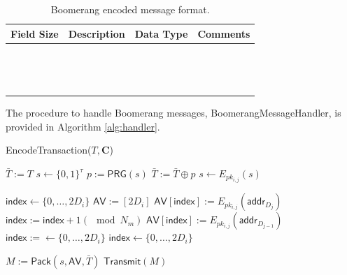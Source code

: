 \begin{table}
\begin{center}
\caption{Boomerang encoded message format.}
\label{tab:msg-header}
    \begin{tabular}{|c|c|c|l|} \hline
    \textbf{Field Size} & {\bf Description} & {\bf Data Type} & {\bf Comments} \\ \hline
    ~ & ~ & ~ & ~ \\
    ~ & ~ & ~ & ~ \\
    ~ & ~ & ~ & ~ \\ \hline
    \end{tabular}
\end{center}
\end{table}

The procedure to handle Boomerang messages, {\sf BoomerangMessageHandler}, is provided in Algorithm \ref{alg:handler}. 

\begin{algorithm}[t!]
\caption{{\sf EncodeTransaction}($T, \mathbf{C}$)}
\label{alg:encode}
\begin{algorithmic}[1]

	\State $\bar{T} := T$
	\State $s \gets \{0,1\}^{\tau}$
		\State $p := \mathsf{PRG}(s)$
		\State $\bar{T} := \bar{T} \oplus p$
		\State $s \gets E_{pk_{i,j}}(s)$
	\EndFor

	\State $\mathsf{index} \gets \{0,\dots,2D_i\}$ %
	\State $\mathsf{AV} := [2D_i]$ %
		\State $\mathsf{AV}[\mathsf{index}] := E_{pk_{i,j}}(\mathsf{addr}_{D_j})$
		\State $\mathsf{index} := \mathsf{index} + 1 (\mod N_m)$
		\State $\mathsf{AV}[\mathsf{index}] := E_{pk_{i,j}}(\mathsf{addr}_{D_{j-1}})$
		\State $\mathsf{index} := \gets \{0,\dots,2D_i\}$
			\State $\mathsf{index} \gets \{0,\dots,2D_i\}$
		\EndWhile
	\EndFor

	\State $M := \mathsf{Pack}(s, \mathsf{AV}, \bar{T})$
	\State $\mathsf{Transmit}(M)$
\EndFor

\end{algorithmic}
\end{algorithm}


